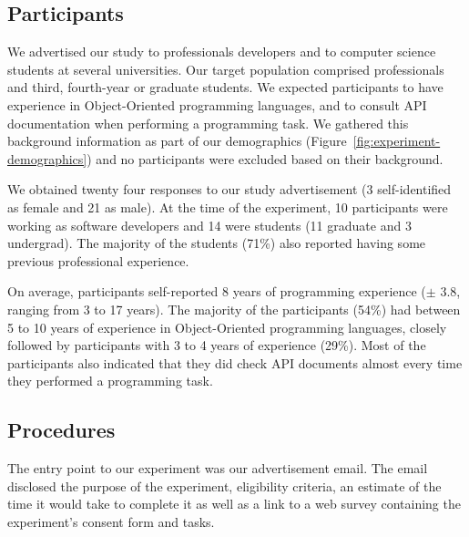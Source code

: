\clearpage



\subsection{Participants}
\label{cp6:participants}


We advertised our study to professionals developers and to computer science students at  several universities. 
Our target population comprised professionals and third, fourth-year or graduate students.
We expected participants to have experience in Object-Oriented programming languages, and to consult API documentation when performing a programming task.
We gathered this background information as part of our demographics (Figure~\ref{fig:experiment-demographics})
and no participants were excluded
based on their background.






We obtained twenty four responses to our study advertisement (3 self-identified as female and 21 as male). 
At the time of the experiment, 10 participants were working as software
developers and 14 were students (11 graduate and 3 undergrad).
The majority of the students (71\%) also reported having some previous professional experience.


On average, participants self-reported 8 years of programming experience ({\small $\pm$} 3.8, ranging from 3 to 17 years).
The majority of the participants (54\%) had between 5 to 10 years of experience in Object-Oriented programming languages,
closely followed by participants  with  3 to 4 years of experience (29\%). 
Most of the participants also indicated that they did check API documents almost every time they performed a programming task. 








\subsection{Procedures}
\label{cp6:procedures}




The entry point to our experiment was our advertisement email.
The email disclosed the purpose of the experiment, eligibility criteria, an estimate of the time it would take to complete it as well as a link 
to a web survey containing the experiment's consent form and tasks. 


